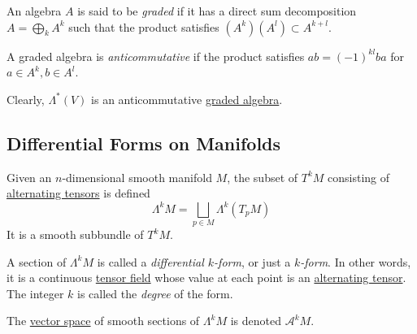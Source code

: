 \documentclass{article}
\newcounter{definition}[section]
\begin{document}
    \begin{definition}
      \label{def:graded-algebra}
    An algebra $A$ is said to be \textit{graded} if it has a direct sum decomposition $A = \bigoplus_k A^k$ such that the product satisfies $(A^k) (A^l) \subset A^{k+l}$. 

    A graded algebra is \textit{anticommutative} if the product satisfies $ab = (-1)^{kl} ba$ for $a \in A^k, b \in A^l$. 
    \end{definition}

    Clearly, $\Lambda^* (V)$ is an anticommutative \hyperref[def:graded-algebra]{graded algebra}. 

  \subsection{Differential Forms on Manifolds}

    \begin{definition}
      \label{def:bundle-of-alternating-k-tensors}
    Given an $n$-dimensional smooth manifold $M$, the subset of $T^k M$ consisting of \hyperref[def:alternating-tensor]{alternating tensors} is defined
    \begin{equation}
      \Lambda^k M = \bigsqcup_{p \in M} \Lambda^k (T_p M)
    \end{equation}
    It is a smooth subbundle of $T^k M$. 
    \end{definition}

    \begin{definition}
      \label{def:differential-k-form}
    A section of $\Lambda^k M$ is called a \textit{differential $k$-form}, or just a \textit{$k$-form}. In other words, it is a continuous \hyperref[def:tensor-field]{tensor field} whose value at each point is an \hyperref[def:alternating-tensor]{alternating tensor}. The integer $k$ is called the \textit{degree} of the form. 
    \end{definition}

    \begin{definition}
      \label{def:the-space-of-smooth-k-forms}
    The \hyperref[lin-def:vector-space]{vector space} of smooth sections of $\Lambda^k M$ is denoted $\mathcal{A}^k M$. 
    \end{definition}
\end{document}

